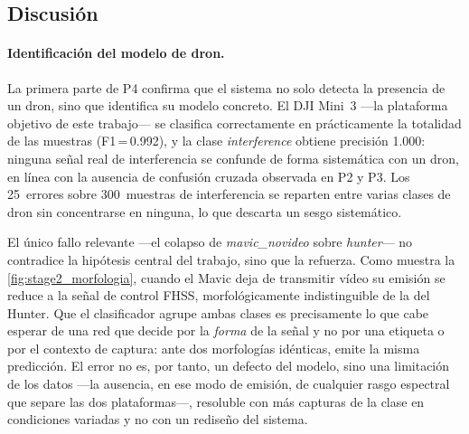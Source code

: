 \subsection{Discusión}
\label{sec:p4_discusion}

\paragraph{Identificación del modelo de dron.}
La primera parte de P4 confirma que el sistema no solo detecta la presencia de un dron, sino que identifica su modelo concreto. El DJI Mini~3 ---la plataforma objetivo de este trabajo--- se clasifica correctamente en prácticamente la totalidad de las muestras (F1\,=\,\num{0,992}), y la clase \emph{interference} obtiene precisión \num{1,000}: ninguna señal real de interferencia se confunde de forma sistemática con un dron, en línea con la ausencia de confusión cruzada observada en P2 y P3. Los \num{25}~errores sobre \num{300}~muestras de interferencia se reparten entre varias clases de dron sin concentrarse en ninguna, lo que descarta un sesgo sistemático.

El único fallo relevante ---el colapso de \emph{mavic\_novideo} sobre \emph{hunter}--- no contradice la hipótesis central del trabajo, sino que la refuerza. Como muestra la \cref{fig:stage2_morfologia}, cuando el Mavic deja de transmitir vídeo su emisión se reduce a la señal de control FHSS, morfológicamente indistinguible de la del Hunter. Que el clasificador agrupe ambas clases es precisamente lo que cabe esperar de una red que decide por la \emph{forma} de la señal y no por una etiqueta o por el contexto de captura: ante dos morfologías idénticas, emite la misma predicción. El error no es, por tanto, un defecto del modelo, sino una limitación de los datos ---la ausencia, en ese modo de emisión, de cualquier rasgo espectral que separe las dos plataformas---, resoluble con más capturas de la clase en condiciones variadas y no con un rediseño del sistema.

